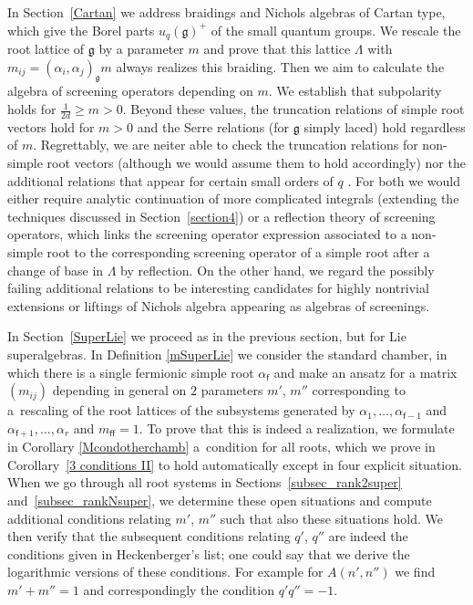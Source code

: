 \documentclass[pdftex]{sigma}%
\numberwithin{equation}{section}
\newcommand{\g}{\mathfrak{g}}
\newcommand{\f}{\mathsf{f}}
\begin{document}
In Section~\ref{Cartan} we address braidings and Nichols algebras of Cartan type, which give the Borel parts $u_q(\g)^+$ of the small quantum groups. We rescale the root lattice of $\g$ by a parameter $m$ and prove that this lattice $\Lambda$ with $m_{ij}=(\alpha_i,\alpha_j)_\g m$ always realizes this braiding. Then we aim to calculate the algebra of screening operators depending on $m$. We establish that subpolarity holds for $\frac{1}{2d}\geq m>0$. Beyond these values, the truncation relations of simple root vectors hold for $m>0$ and the Serre relations (for $\g$ simply laced) hold regardless of $m$. Regrettably, we are neiter able to check the truncation relations for non-simple root vectors (although we would assume them to hold accordingly) nor the additional relations that appear for certain small orders of $q$ \cite{AA17}. For both we would either require analytic continuation of more complicated integrals (extending the techniques discussed in Section~\ref{section4}) or a reflection theory of screening operators, which links the screening operator expression associated to a non-simple root to the corresponding screening operator of a simple root after a change of base in $\Lambda$ by reflection. On the other hand, we regard the possibly failing additional relations to be interesting candidates for highly nontrivial extensions or liftings of Nichols algebra appearing as algebras of screenings.

In Section~\ref{SuperLie} we proceed as in the previous section, but for Lie superalgebras. In Definition \ref{mSuperLie} we consider the standard chamber, in which there is a single fermionic simple root $\alpha_{\f}$ and make an ansatz for a matrix $(m_{ij})$ depending in general on $2$ parameters $m'$, $m''$ corresponding to a~rescaling of the root lattices of the subsystems generated by $\alpha_1,\dots, \alpha_{\f-1}$ and $\alpha_{\f+1},\dots,\alpha_r$ and ${m_{\f\f}=1}$. To prove that this is indeed a realization, we formulate in Corollary \ref{Mcondotherchamb} a~condition for all roots, which we prove in Corollary~\ref{3 conditions II} to hold automatically except in four explicit situation. When we go through all root systems in Sections~\ref{subsec_rank2super} and~\ref{subsec_rankNsuper}, we determine these open situations and compute additional conditions relating $m'$, $m''$ such that also these situations hold. We then verify that the subsequent conditions relating $q'$, $q''$ are indeed the conditions given in Heckenberger's list; one could say that we derive the logarithmic versions of these conditions. For example for $A(n',n'')$ we find $m'+m''=1$ and correspondingly the condition $q'q''=-1$.
\end{document}
